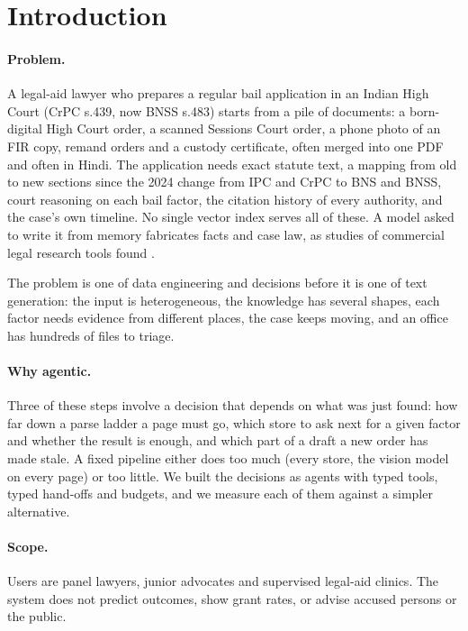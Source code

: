 \section{Introduction}

\paragraph{Problem.} A legal-aid lawyer who prepares a regular bail application in an Indian High Court (CrPC s.439, now BNSS s.483) starts from a pile of documents: a born-digital High Court order, a scanned Sessions Court order, a phone photo of an FIR copy, remand orders and a custody certificate, often merged into one PDF and often in Hindi. The application needs exact statute text, a mapping from old to new sections since the 2024 change from IPC and CrPC to BNS and BNSS, court reasoning on each bail factor, the citation history of every authority, and the case's own timeline. No single vector index serves all of these. A model asked to write it from memory fabricates facts and case law, as studies of commercial legal research tools found \citep{magesh2025}.

The problem is one of data engineering and decisions before it is one of text generation: the input is heterogeneous, the knowledge has several shapes, each factor needs evidence from different places, the case keeps moving, and an office has hundreds of files to triage.

\paragraph{Why agentic.} Three of these steps involve a decision that depends on what was just found: how far down a parse ladder a page must go, which store to ask next for a given factor and whether the result is enough, and which part of a draft a new order has made stale. A fixed pipeline either does too much (every store, the vision model on every page) or too little. We built the decisions as agents with typed tools, typed hand-offs and budgets, and we measure each of them against a simpler alternative.

\paragraph{Scope.} Users are panel lawyers, junior advocates and supervised legal-aid clinics. The system does not predict outcomes, show grant rates, or advise accused persons or the public.

